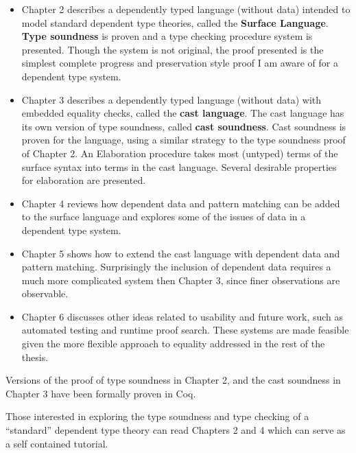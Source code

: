 \begin{itemize}
\item Chapter 2 describes a dependently typed language (without data) intended to model standard dependent type theories, called the \textbf{Surface Language}.
\textbf{Type soundness} is proven and a \bidir{} type checking procedure system is presented.
Though the system is not original, the proof presented is the simplest complete progress and preservation style proof I am aware of for a dependent type system.   
\item Chapter 3 describes a dependently typed language (without data) with embedded equality checks, called the \textbf{cast language}.
The cast language has its own version of type soundness, called \textbf{cast soundness}.
Cast soundness is proven for the language, using a similar strategy to the type soundness proof of Chapter 2.
An Elaboration procedure takes most (untyped) terms of the surface syntax into terms in the cast language.
Several desirable properties for elaboration are presented. %
\item Chapter 4 reviews how dependent data and pattern matching can be added to the surface language and explores some of the issues of data in a dependent type system.
\item Chapter 5 shows how to extend the cast language with dependent data and pattern matching.
Surprisingly the inclusion of dependent data requires a much more complicated system then Chapter 3, since finer observations are observable.
\item Chapter 6 discusses other ideas related to usability and future work, such as automated testing and runtime proof search.
These systems are made feasible given the more flexible approach to equality addressed in the rest of the thesis.
\end{itemize}
Versions of the proof of type soundness in Chapter 2, and the cast soundness in Chapter 3 have been formally proven in Coq.

Those interested in exploring the type soundness and type checking of a ``standard'' dependent type theory can read Chapters 2 and 4 which can serve as a self contained tutorial.
